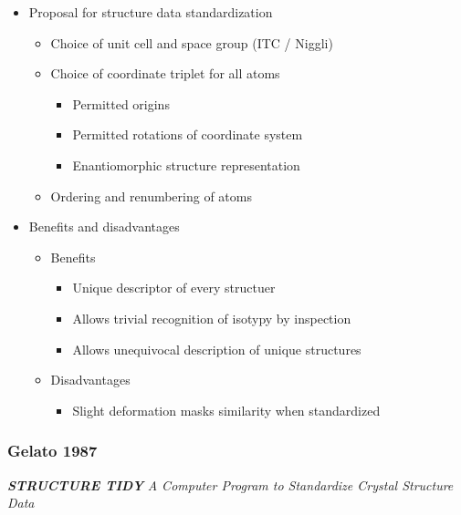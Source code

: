 \documentclass[11pt]{article}
\providecommand{\tightlist}{%
      \setlength{\itemsep}{0pt}\setlength{\parskip}{0pt}}
\begin{document}
\begin{itemize}
\tightlist
\item
  Proposal for structure data standardization

  \begin{itemize}
  \tightlist
  \item
    Choice of unit cell and space group (ITC / Niggli)
  \item
    Choice of coordinate triplet for all atoms

    \begin{itemize}
    \tightlist
    \item
      Permitted origins
    \item
      Permitted rotations of coordinate system
    \item
      Enantiomorphic structure representation
    \end{itemize}
  \item
    Ordering and renumbering of atoms
  \end{itemize}
\item
  Benefits and disadvantages

  \begin{itemize}
  \tightlist
  \item
    Benefits

    \begin{itemize}
    \tightlist
    \item
      Unique descriptor of every structuer
    \item
      Allows trivial recognition of isotypy by inspection
    \item
      Allows unequivocal description of unique structures
    \end{itemize}
  \item
    Disadvantages

    \begin{itemize}
    \tightlist
    \item
      Slight deformation masks similarity when standardized
    \end{itemize}
  \end{itemize}
\end{itemize}

    \subsubsection{Gelato 1987}\label{gelato-1987}

\textbf{\emph{STRUCTURE TIDY}} \emph{A Computer Program to Standardize
Crystal Structure Data}
\end{document}
